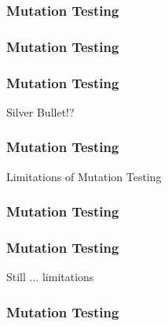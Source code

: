   \begin{frame}
    \frametitle{Mutation Testing}
    
    \begin{figure}[!htb]
    \centering
        \centering
        \vspace*{-3.5cm}
        {\fontsize{50}{50}}
    \end{figure}
    \end{frame}

  \begin{frame}
    \frametitle{Mutation Testing}
    
    \begin{figure}[!htb]
    \centering
        \vspace*{-2.15cm}
        {\fontsize{50}{50}}
        
    \end{figure}
    \end{frame}

  \begin{frame}
    \frametitle{Mutation Testing}
    \centering
    {\HUGE Silver Bullet!?}
  \end{frame}

  \begin{frame}
    \frametitle{Mutation Testing}
    \centering
    {\HUGE Limitations of Mutation Testing}
  \end{frame}

  \begin{frame}
    \frametitle{Mutation Testing}
    \begin{figure}[!htb]
    \centering
    \small{}
    \end{figure}
    \end{frame}

  \begin{frame}
    \frametitle{Mutation Testing}
    \centering
    {\HUGE Still $\dots$ limitations}
  \end{frame}

  \begin{frame}
    \frametitle{Mutation Testing}
    \centering
    
  \end{frame}
